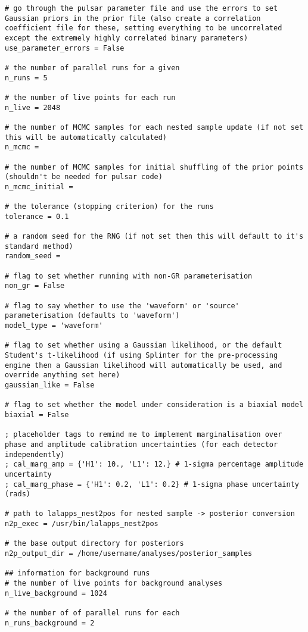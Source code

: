\begin{lstlisting}[frame=single]
# go through the pulsar parameter file and use the errors to set Gaussian priors in the prior file (also create a correlation coefficient file for these, setting everything to be uncorrelated except the extremely highly correlated binary parameters)
use_parameter_errors = False

# the number of parallel runs for a given
n_runs = 5

# the number of live points for each run
n_live = 2048

# the number of MCMC samples for each nested sample update (if not set this will be automatically calculated)
n_mcmc =

# the number of MCMC samples for initial shuffling of the prior points (shouldn't be needed for pulsar code)
n_mcmc_initial =

# the tolerance (stopping criterion) for the runs
tolerance = 0.1

# a random seed for the RNG (if not set then this will default to it's standard method)
random_seed =

# flag to set whether running with non-GR parameterisation
non_gr = False

# flag to say whether to use the 'waveform' or 'source' parameterisation (defaults to 'waveform')
model_type = 'waveform'

# flag to set whether using a Gaussian likelihood, or the default Student's t-likelihood (if using Splinter for the pre-processing engine then a Gaussian likelihood will automatically be used, and override anything set here)
gaussian_like = False

# flag to set whether the model under consideration is a biaxial model
biaxial = False

; placeholder tags to remind me to implement marginalisation over phase and amplitude calibration uncertainties (for each detector independently)
; cal_marg_amp = {'H1': 10., 'L1': 12.} # 1-sigma percentage amplitude uncertainty
; cal_marg_phase = {'H1': 0.2, 'L1': 0.2} # 1-sigma phase uncertainty (rads)

# path to lalapps_nest2pos for nested sample -> posterior conversion
n2p_exec = /usr/bin/lalapps_nest2pos

# the base output directory for posteriors
n2p_output_dir = /home/username/analyses/posterior_samples

## information for background runs
# the number of live points for background analyses
n_live_background = 1024

# the number of of parallel runs for each
n_runs_background = 2


\end{lstlisting}
